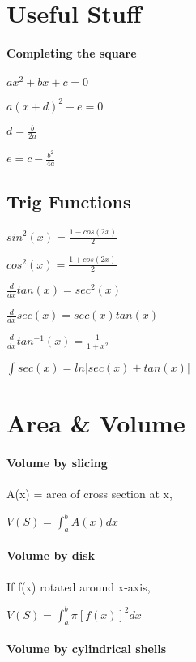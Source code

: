 \documentclass[10pt,landscape]{article}
\begin{document}
	
	\raggedright
	\footnotesize
	\begin{multicols}{4}
\section{Useful Stuff}

\paragraph{Completing the square}

$ax^2 + bx + c = 0$

$a(x+d)^2 + e = 0$

$d = \frac{b}{2a}$

$e = c - \frac{b^2}{4a}$

\subsection{Trig Functions}

$sin^2(x) = \frac{1-cos(2x)}{2}$

$cos^2(x) = \frac{1+cos(2x)}{2}$

$\frac{d}{dx}tan(x) = sec^2(x)$

$\frac{d}{dx}sec(x) = sec(x)tan(x)$

$\frac{d}{dx}tan^{-1}(x) = \frac{1}{1+x^2}$

$\int sec(x) = ln|sec(x)+tan(x)|$


\section{Area \& Volume}

\paragraph{Volume by slicing}

A(x) = area of cross section at x,

$V(S) = \int_{a}^{b}A(x)dx$

\paragraph{Volume by disk}

If f(x) rotated around x-axis,

$V(S) = \int_{a}^{b}\pi [f(x)]^2dx$

\paragraph{Volume by cylindrical shells}


\end{multicols}
\end{document}
